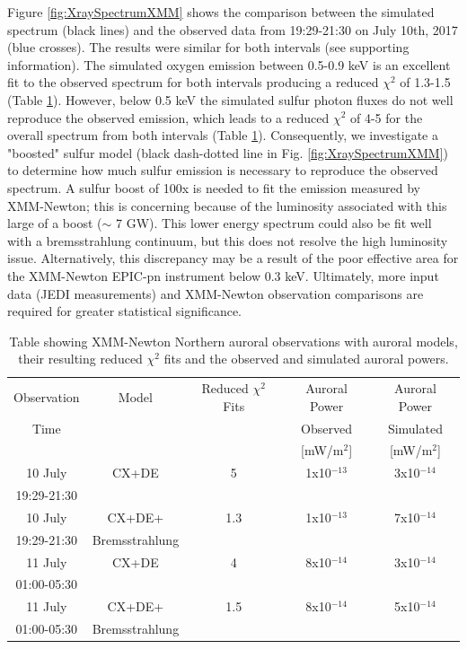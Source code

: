 \documentclass[draft]{agujournal2018}
\begin{document}
Figure \ref{fig:XraySpectrumXMM} shows the comparison between the simulated spectrum (black lines) and the observed data from 19:29-21:30 on July 10th, 2017 (blue crosses).
The results were similar for both intervals (see supporting information).
The simulated oxygen emission between 0.5-0.9 keV is an excellent fit to the observed spectrum for both intervals producing a reduced $\chi^2$ of 1.3-1.5 (Table \ref{tab:XMMComparison}).
However, below 0.5 keV the simulated sulfur photon fluxes do not well reproduce the observed emission, which leads to a reduced $\chi^2$ of 4-5 for the overall spectrum from both intervals (Table \ref{tab:XMMComparison}).
Consequently, we investigate a "boosted" sulfur model (black dash-dotted line in Fig. \ref{fig:XraySpectrumXMM}) to determine how much sulfur emission is necessary to reproduce the observed spectrum.
A sulfur boost of 100x is needed to fit the emission measured by XMM-Newton; this is concerning because of the luminosity associated with this large of a boost ($\sim$ 7 GW).
This lower energy spectrum could also be fit well with a bremsstrahlung continuum, but this does not resolve the high luminosity issue.
Alternatively, this discrepancy may be a result of the poor effective area for the XMM-Newton EPIC-pn instrument below 0.3 keV.
Ultimately, more input data (JEDI measurements) and XMM-Newton observation comparisons are required for greater statistical significance.

\begin{table}
    \centering
    \begin{tabular}{c|c|c|c|c}
    Observation & Model & Reduced $\chi^2$ Fits & Auroral Power & Auroral Power  \\
    Time &  &  & Observed & Simulated  \\
     &  &  & [mW/m$^2$] & [mW/m$^2$] \\ \cline{1-5}
     10 July     & CX+DE          & 5   & 1x10$^{-13}$ & 3x10$^{-14}$ \\
     19:29-21:30 &                &     &              &              \\ \cline{1-5}
     10 July     & CX+DE+         & 1.3 & 1x10$^{-13}$ & 7x10$^{-14}$ \\
     19:29-21:30 & Bremsstrahlung &     &              &              \\ \cline{1-5}
     11 July     & CX+DE          & 4   & 8x10$^{-14}$ & 3x10$^{-14}$ \\
     01:00-05:30 &                &     &              &              \\ \cline{1-5}
     11 July     & CX+DE+         & 1.5 & 8x10$^{-14}$ & 5x10$^{-14}$ \\
     01:00-05:30 & Bremsstrahlung &     &              &              \\ \cline{1-5}
    \end{tabular}
    \label{tab:XMMComparison}
    \caption{Table showing XMM-Newton Northern auroral observations with auroral models, their resulting reduced $\chi^2$ fits and the observed and simulated auroral powers.}
\end{table}
\end{document}
